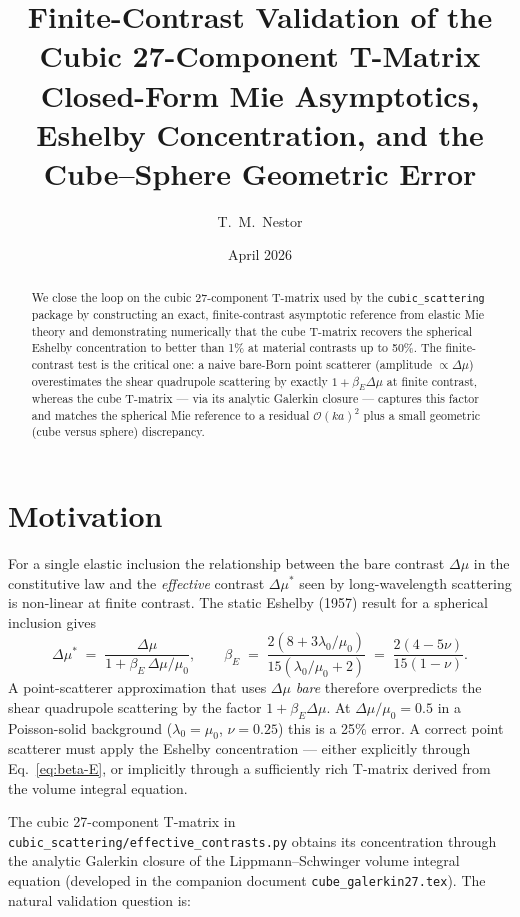 \documentclass[11pt,a4paper]{article}
\title{Finite-Contrast Validation of the Cubic 27-Component T-Matrix\\
\large Closed-Form Mie Asymptotics, Eshelby Concentration, and the Cube--Sphere Geometric Error}
\author{T.~M.~Nestor}
\date{April 2026}
\newcommand{\D}{\Delta}
\newcommand{\order}{\mathcal{O}}
\newcommand{\code}[1]{\texttt{#1}}
\begin{document}
\maketitle
\begin{abstract}
We close the loop on the cubic 27-component T-matrix used by the
\code{cubic\_scattering} package by constructing an exact, finite-contrast
asymptotic reference from elastic Mie theory and demonstrating numerically
that the cube T-matrix recovers the spherical Eshelby concentration to
better than 1\% at material contrasts up to 50\%.  The finite-contrast
test is the critical one: a naive bare-Born point scatterer
(amplitude $\propto \D\mu$) overestimates the shear quadrupole
scattering by exactly $1+\beta_E\D\mu$ at finite contrast, whereas the
cube T-matrix --- via its analytic Galerkin closure --- captures this
factor and matches the spherical Mie reference to a residual
$\order{(ka)^2}$ plus a small geometric (cube versus sphere)
discrepancy.
\end{abstract}

\tableofcontents

\section{Motivation}

For a single elastic inclusion the relationship between the bare contrast
$\D\mu$ in the constitutive law and the \emph{effective} contrast $\D\mu^*$
seen by long-wavelength scattering is non-linear at finite contrast.  The
static Eshelby (1957) result for a spherical inclusion gives
\begin{equation}
\D\mu^* \;=\; \frac{\D\mu}{1+\beta_E\,\D\mu/\mu_0},
\qquad
\beta_E \;=\; \frac{2(8+3\lambda_0/\mu_0)}{15(\lambda_0/\mu_0+2)}
            \;=\; \frac{2(4-5\nu)}{15(1-\nu)}.
\label{eq:beta-E}
\end{equation}
A point-scatterer approximation that uses $\D\mu$ \emph{bare} therefore
overpredicts the shear quadrupole scattering by the factor $1+\beta_E\D\mu$.
At $\D\mu/\mu_0=0.5$ in a Poisson-solid background ($\lambda_0=\mu_0$,
$\nu=0.25$) this is a 25\% error.  A correct point scatterer must apply
the Eshelby concentration --- either explicitly through
Eq.~\eqref{eq:beta-E}, or implicitly through a sufficiently rich
T-matrix derived from the volume integral equation.

The cubic 27-component T-matrix in
\code{cubic\_scattering/effective\_contrasts.py} obtains its concentration
through the analytic Galerkin closure of the Lippmann--Schwinger volume
integral equation (developed in the companion document
\code{cube\_galerkin27.tex}).  The natural validation question is:
\end{document}
